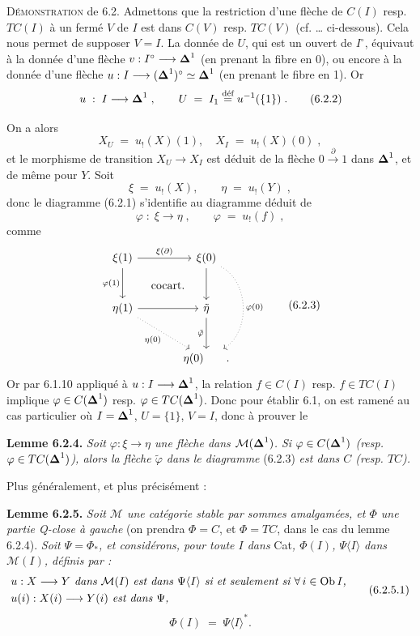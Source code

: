\textsc{Démonstration} de 6.2. Admettons que la restriction d'une flèche de $C(I)$ resp. $TC(I)$ à un fermé $V$ de $I$ est dans $C(V)$ resp. $TC(V)$ (cf. \dots{} ci-dessous). Cela nous permet de supposer $V = I$. La donnée de $U$, qui est un ouvert de $I^{\circ}$, équivaut à la donnée d'une flèche $v : I^{\circ} \longrightarrow \boldsymbol{\Delta}^1$ (en prenant la fibre en 0), ou encore à la donnée d'une flèche $u : I \longrightarrow (\boldsymbol{\Delta}^1)^{\circ} \simeq \boldsymbol{\Delta}^1$ (en prenant le fibre en 1). Or %
\[
u \;:\; I \longrightarrow \boldsymbol{\Delta}^1\;, \qquad U \;=\; I_1 \overset{\text{déf}}{=} u^{-1}(\{1\})\;.
\tag*{(6.2.2)}
\]

On a alors
\[
X_U \;=\; u_!(X)(1), \quad X_I \;=\; u_!(X)(0)\;,
\]
et le morphisme de transition $X_U \longrightarrow X_I$ est déduit de la flèche $0 \xrightarrow{\ \partial\ } 1$ dans $\boldsymbol{\Delta}^1$, et de même pour $Y$. Soit
\[
\xi \;=\; u_!(X), \qquad \eta \;=\; u_!(Y)\;,
\]
donc le diagramme (6.2.1) s'identifie au diagramme déduit de
\[
\varphi \;:\; \xi \longrightarrow \eta\;, \qquad \varphi \;=\; u_!(f)\;,
\]
comme
\[
\begin{tikzcd}[row sep=large, column sep=large]
\xi(1) \arrow[r, "\xi(\partial)"] \arrow[d, "\varphi(1)"'] \arrow[dr, phantom, "\text{cocart.}"] & \xi(0) \arrow[d] \arrow[dd, dotted, bend left=60, "\varphi(0)"] \\
\eta(1) \arrow[r] \arrow[dr, dotted, "\eta(0)"'] & \tilde{\eta} \arrow[d, "\tilde{\varphi}"'] \\
 & \eta(0) \qquad .
\end{tikzcd}
\tag*{(6.2.3)}
\]
Or par 6.1.10 appliqué à $u : I \longrightarrow \boldsymbol{\Delta}^1$, la relation $f \in C(I)$ resp. $f \in TC(I)$ implique $\varphi \in C(\boldsymbol{\Delta}^1)$ resp. $\varphi \in TC(\boldsymbol{\Delta}^1)$. Donc pour établir 6.1, on est ramené au cas particulier où $I = \boldsymbol{\Delta}^1$, $U = \{1\}$, $V = I$, donc à prouver le

\textbf{Lemme 6.2.4.} \textit{Soit $\varphi : \xi \longrightarrow \eta$ une flèche dans $\mathcal{M}(\boldsymbol{\Delta}^1)$. Si $\varphi \in C(\boldsymbol{\Delta}^1)$ (resp.}
\textit{$\varphi \in TC(\boldsymbol{\Delta}^1)$), alors la flèche $\tilde{\varphi}$ dans le diagramme} (6.2.3) \textit{est dans $C$ (resp. $TC$).}

Plus généralement, et plus précisément :

\textbf{Lemme 6.2.5.} \textit{Soit $\mathcal{M}$ une catégorie stable par sommes amalgamées, et $\Phi$ une partie Q-close à gauche} (on prendra $\Phi = C$, et $\Phi = TC$, dans le cas du lemme 6.2.4). \textit{Soit $\Psi = \Phi_{*}$, et considérons, pour toute $I$ dans} Cat\textit{, $\Phi(I)$, $\Psi\langle I\rangle$ dans $\mathcal{M}(I)$, définis par :}
\[
\begin{aligned}
&\text{\textit{$u : X \longrightarrow Y$ dans $\mathcal{M}(I)$ est dans $\Psi\langle I\rangle$ si et seulement si $\forall\, i \in \operatorname{Ob} I$,}}\\
&\text{\textit{$u(i) : X(i) \longrightarrow Y(i)$ est dans $\Psi$,}}
\end{aligned}
\tag*{(6.2.5.1)}
\]
\[
\Phi(I) \;=\; \Psi\langle I\rangle^{*}.
\tag*{(6.2.5.2)}
\]


